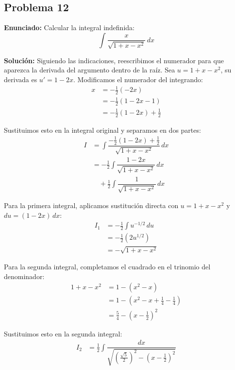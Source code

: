 \subsection*{Problema 12}

\textbf{Enunciado:}
Calcular la integral indefinida:
\begin{equation*}
  \int \frac{x}{\sqrt{1 + x - x^2}} \, dx
\end{equation*}

\textbf{Solución:}
Siguiendo las indicaciones, reescribimos el numerador para que aparezca la derivada del argumento dentro de la raíz. 
Sea $u = 1 + x - x^2$, su derivada es $u' = 1 - 2x$. 
Modificamos el numerador del integrando:
\begin{align*}
  x &= -\frac{1}{2}(-2x) \\
  &= -\frac{1}{2}(1 - 2x - 1) \\
  &= -\frac{1}{2}(1 - 2x) + \frac{1}{2}
\end{align*}

Sustituimos esto en la integral original y separamos en dos partes:
\begin{align*}
  I &= \int \dfrac{-\frac{1}{2}(1 - 2x) + \frac{1}{2}}{\sqrt{1 + x - x^2}} \, dx \\
  &= -\frac{1}{2} \int \dfrac{1 - 2x}{\sqrt{1 + x - x^2}} \, dx \\
  &\quad + \frac{1}{2} \int \dfrac{1}{\sqrt{1 + x - x^2}} \, dx
\end{align*}

Para la primera integral, aplicamos sustitución directa con $u = 1 + x - x^2$ y $du = (1 - 2x) \, dx$:
\begin{align*}
  I_1 &= -\frac{1}{2} \int u^{-1/2} \, du \\
  &= -\frac{1}{2} \left( 2u^{1/2} \right) \\
  &= -\sqrt{1 + x - x^2}
\end{align*}

Para la segunda integral, completamos el cuadrado en el trinomio del denominador:
\begin{align*}
  1 + x - x^2 &= 1 - \left( x^2 - x \right) \\
  &= 1 - \left( x^2 - x + \frac{1}{4} - \frac{1}{4} \right) \\
  &= \frac{5}{4} - \left( x - \frac{1}{2} \right)^2
\end{align*}

Sustituimos esto en la segunda integral:
\begin{align*}
  I_2 &= \frac{1}{2} \int \dfrac{dx}{\sqrt{\left(\frac{\sqrt{5}}{2}\right)^2 - \left(x - \frac{1}{2}\right)^2}}
\end{align*}

